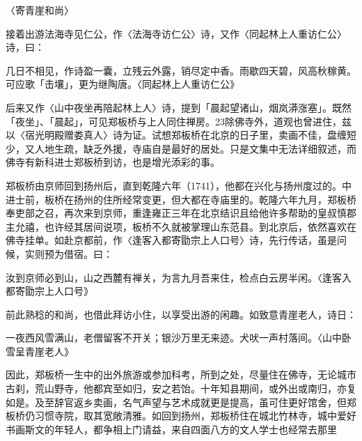 〈寄青崖和尚〉

接着出游法海寺见仁公，作〈法海寺访仁公〉诗，又作〈同起林上人重访仁公〉诗，曰：

\vfill
\begin{BookNotes}
\end{BookNotes}

\begin{BookQuote}
几日不相见，作诗盈一囊，立残云外露，销尽定中香。雨歇四天碧，风高秋稼黄。可应歌「击壤」，更为继陶唐。〈同起林上人重访仁公》
\end{BookQuote}

后来又作〈山中夜坐再陪起林上人〉诗，提到「晨起望诸山，烟岚漭涨塞」。既然「夜坐」、「晨起」，可见郑板桥与上人同住禅房。23除佛寺外，道观也曾进住，兹以〈宿光明殿赠娄真人〉诗为证。试想郑板桥在北京的日子里，卖画不佳，盘缠短少，又人地生疏，缺乏外援，寺庙自是最好的居处。只是文集中无法详细叙述，而佛寺有新科进士郑板桥到访，也是增光添彩的事。

郑板桥由京师回到扬州后，直到乾隆六年（1741），他都在兴化与扬州度过的。中进士前，板桥在扬州的住所经常变更，但大都在寺庙里的。乾隆六年九月，郑板桥奉吏部之召，再次来到京师，重逢雍正三年在北京结识且给他许多帮助的皇叔慎郡主允禧，也许经其居间说项，板桥不久就被掌理山东范县。到北京后，依然喜欢在佛寺挂单。如赴京都前，作〈逢客入都寄勖宗上人口号〉诗，先行传话，虽是问候，实则预为借宿。曰：

\begin{BookQuote}
汝到京师必到山，山之西麓有禅关，为言九月吾来住，检点白云房半闲。〈逢客入都寄勖宗上人口号》
\end{BookQuote}

前此熟稔的和尚，也借此拜访小住，以享受出游的闲趣。如致意青崖老人，诗日：

\begin{BookQuote}
一夜西风雪满山，老僧留客不开关；银沙万里无来迹。犬吠一声村落间。〈山中卧雪呈青崖老人》
\end{BookQuote}

因此，郑板桥一生中的出外旅游或参加科考，所到之处，尽量住在佛寺，无论城市古刹，荒山野寺，他都宾至如归，安之若饴。十年知县期间，或外出或南归，亦复如是。及至辞官返乡卖画，名气声望与艺术成就更是提高，虽可住更好馆舍，但郑板桥仍习惯寺院，取其宽敞清雅。如回到扬州，郑板桥住在城北竹林寺，城中爱好书画斯文的年轻人，都争相上门请益，来自四面八方的文人学士也经常去那里

\vfill
\begin{BookNotes}
\end{BookNotes}

